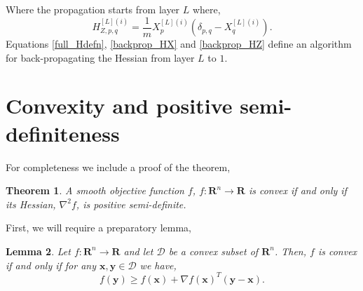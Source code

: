 \documentclass[nohyperref]{article}
\theoremstyle{plain}
\newtheorem{theorem}{Theorem}[section]
\newtheorem{lemma}[theorem]{Lemma}
\theoremstyle{definition}
\theoremstyle{remark}
\begin{document}
Where the propagation starts from layer $L$ where,
\begin{equation}
H_{Z,p,q}^{[L](i)}=\frac{1}{m} X^{[L](i)}_p\left(\delta_{p,q}-X^{[L](i)}_q \right)\label{H_Z_initial}.
\end{equation}
Equations \ref{full_Hdefn}, \ref{backprop_HX} and \ref{backprop_HZ} define an algorithm for back-propagating the Hessian from layer $L$ to $1$.
\section{Convexity and positive semi-definiteness}\label{Convexity}
For completeness we include a proof of the theorem,
\begin{theorem}
\label{thm:convexity}
A smooth objective function $f$, $f:\mathbf{R}^n \to \mathbf{R}$ is convex if and only if its Hessian, $\nabla^2 f $, is positive semi-definite.
\end{theorem}
First, we will require a preparatory lemma,
\begin{lemma}
\label{prep_lemma}
Let $f : \mathbf{R}^n \to \mathbf{R}$ and let $\mathcal{D} $ be a convex subset of $\mathbf{R}^n$. Then, $f$ is convex if and only if for
any $\mathbf{x}, \mathbf{y} \in \mathcal{D}$ we have,
\begin{equation}
f(\mathbf{y}) \ge f(\mathbf{x}) + \nabla f(\mathbf{x})^T (\mathbf{y} - \mathbf{x}).
\end{equation}
\end{lemma}
\end{document}

